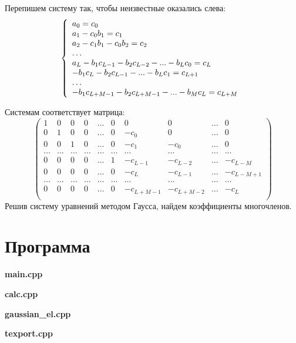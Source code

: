 \documentclass[a4paper,14pt]{article}
\begin{document}
Перепишем систему так, чтобы неизвестные оказались слева:
\[
	\left\{
		\begin{array}{l}
			a_0 = c_0\\ 
			a_1 - c_0b_1 = c_1\\
			a_2 - c_1b_1 - c_0b_2 = c_2\\
			\ldots\\
			a_L - b_1c_{L-1} - b_2c_{L-2} - ... - b_Lc_0=  c_L\\
			- b_1c_L - b_2c_{L-1} - ... - b_Lc_1 = c_{L+1}\\
			\ldots\\
			- b_1c_{L+M-1} - b_2c_{L+M-1} - ... - b_Mc_{L} = c_{L+M} 
		\end{array}
		\right. \\
	\]

Системам соответствует матрица:
$$
	\begin{pmatrix}
		1	&	0	&	0	&	0	&	\ldots	&	0	&	0	&	0	&	\ldots	&	0	\\
		0	&	1	&	0	&	0	&	\ldots	&	0	&	-c_0	&	0	&	\ldots	&	0	\\
		0	&	0	&	1	&	0	&	\ldots	&	0	&	-c_1	&	-c_0	&	\ldots	&	0	\\
		\ldots	&	\ldots	&	\ldots	&	\ldots	&	\ldots	&	\ldots	&	\ldots	&	\ldots	&	\ldots	&	\ldots	\\
		0	&	0	&	0	&	0	&	\ldots	&	1	&-c_{L-1}	&-c_{L-2}	&	\ldots	&-c_{L-M}	\\
		0	&	0	&	0	&	0	&	\ldots	&	0	&	-c_L	&-c_{L-1}	&	\ldots	&-c_{L-M+1}	\\
		\ldots	&	\ldots	&	\ldots	&	\ldots	&	\ldots	&	\ldots	&	\ldots	&	\ldots	&	\ldots	&	\ldots	\\
		0	&	0	&	0	&	0	&	\ldots	&	0	&-c_{L+M-1}	&-c_{L+M-2}	&	\ldots	&-c_{L}	\\
	\end{pmatrix}
	$$
Решив систему уравнений методом Гаусса, найдем коэффициенты многочленов.
\clearpage
\section{Программа}
\textbf{main.cpp}

\clearpage

\textbf{calc.cpp}

\clearpage

\textbf{gaussian\_el.cpp}

\clearpage

\textbf{texport.cpp}

\clearpage
\end{document}
